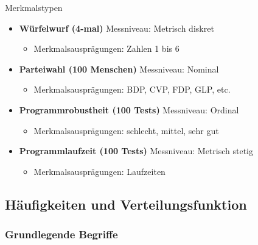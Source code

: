 \begin{example2}{Merkmalstypen}
    \small
\begin{itemize}
    \item \textbf{Würfelwurf (4-mal)} Messniveau: Metrisch diskret
    \begin{itemize}
        \item Merkmalsausprägungen: Zahlen 1 bis 6
    \end{itemize}
    
    \item \textbf{Parteiwahl (100 Menschen)} Messniveau: Nominal
    \begin{itemize}
        \item Merkmalsausprägungen: BDP, CVP, FDP, GLP, etc.
    \end{itemize}
    
    \item \textbf{Programmrobustheit (100 Tests)} Messniveau: Ordinal
    \begin{itemize}
        \item Merkmalsausprägungen: schlecht, mittel, sehr gut
    \end{itemize}
    
    \item \textbf{Programmlaufzeit (100 Tests)} Messniveau: Metrisch stetig
    \begin{itemize}
        \item Merkmalsausprägungen: Laufzeiten
    \end{itemize}
\end{itemize}
\end{example2}

\subsection{Häufigkeiten und Verteilungsfunktion}

\subsubsection{Grundlegende Begriffe}

